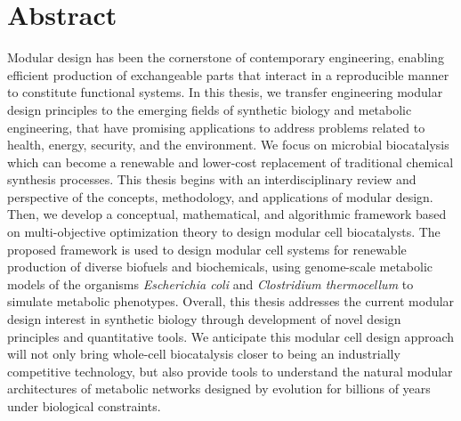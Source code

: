 \chapter*{Abstract}\label{ch:abstract}
Modular design has been the cornerstone of contemporary engineering, enabling efficient production of exchangeable parts that interact in a reproducible manner to constitute functional systems.
    In this thesis, we transfer engineering modular design principles to the emerging fields of synthetic biology and metabolic engineering, that have promising applications to address problems related to health, energy, security, and the environment.
    We focus on microbial biocatalysis which can become a renewable and lower-cost replacement of traditional chemical synthesis processes.
    This thesis begins with an interdisciplinary review and perspective of the concepts, methodology, and applications of modular design.
    Then, we develop a conceptual, mathematical, and algorithmic framework based on multi-objective optimization theory to design modular cell biocatalysts.
    The proposed framework is used to design modular cell systems for renewable production of diverse biofuels and biochemicals, using
    genome-scale metabolic models of the organisms \textit{Escherichia coli} and \textit{Clostridium thermocellum} to simulate metabolic phenotypes.
    Overall, this thesis addresses the current modular design interest in synthetic biology through development of novel design principles and quantitative tools.
    We anticipate this modular cell design approach will not only bring whole-cell biocatalysis closer to being an industrially competitive technology, but also provide tools to understand the natural modular architectures of metabolic networks designed by evolution for billions of years under biological constraints.
